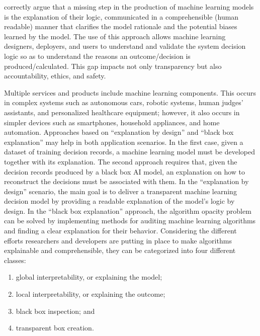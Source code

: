 \citet{chap:10:Guidottietal:2019} correctly argue that a missing step in the production of machine learning models is the explanation of their logic, communicated in a comprehensible (human readable) manner that clarifies the model rationale and the potential biases learned by the model. The use of this approach allows machine learning designers, deployers, and users to understand and validate the system decision logic so as to understand the reasons an outcome/{\allowbreak}decision is produced/{\allowbreak}calculated. This gap impacts not only transparency but also accountability, ethics, and safety.

Multiple services and products include machine learning components. This occurs in complex systems such as autonomous cars, robotic systems, human judges' assistants, and personalized healthcare equipment; however, it also occurs in simpler devices such as smartphones, household appliances, and home automation. Approaches based on ``explanation by design'' and ``black box explanation'' may help in both application scenarios. In the first case, given a dataset of training decision records, a machine learning model must be developed together with its explanation. The second approach requires that, given the decision records produced by a black box AI model, an explanation on how to reconstruct the decisions must be associated with them. In the ``explanation by design'' scenario, the main goal is to deliver a transparent machine learning decision model by providing a readable explanation of the model's logic by design. In the ``black box explanation'' approach, the algorithm opacity problem can be solved by implementing methods for auditing machine learning algorithms and finding a clear explanation for their behavior. Considering the different efforts researchers and developers are putting in place to make algorithms explainable and comprehensible, they can be categorized into four different classes:

\bgroup
\def\labelenumi{(\arabic{enumi})}
\begin{enumerate}
\item global interpretability, or explaining the model;

\item local interpretability, or explaining the outcome;

\item black box inspection; and

\item transparent box creation.
\end{enumerate}
\egroup
\removelastskip{\vspace*{14pt}\pagebreak}

